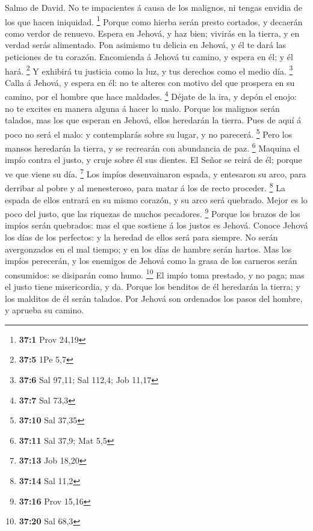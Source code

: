  Salmo de David. No te impacientes á causa de los malignos,
ni tengas envidia de los que hacen iniquidad. \footnote{\textbf{37:1}
  Prov 24,19}  Porque como hierba serán presto cortados, y
decaerán como verdor de renuevo.  Espera en Jehová, y haz
bien; vivirás en la tierra, y en verdad serás alimentado. 
Pon asimismo tu delicia en Jehová, y él te dará las peticiones de tu
corazón.  Encomienda á Jehová tu camino, y espera en él; y
él hará. \footnote{\textbf{37:5} 1Pe 5,7}  Y exhibirá tu
justicia como la luz, y tus derechos como el medio día. \footnote{\textbf{37:6}
  Sal 97,11; Sal 112,4; Job 11,17}  Calla á Jehová, y espera
en él: no te alteres con motivo del que prospera en su camino, por el
hombre que hace maldades. \footnote{\textbf{37:7} Sal 73,3} 
Déjate de la ira, y depón el enojo: no te excites en manera alguna á
hacer lo malo.  Porque los malignos serán talados, mas los
que esperan en Jehová, ellos heredarán la tierra.  Pues de
aquí á poco no será el malo: y contemplarás sobre su lugar, y no
parecerá. \footnote{\textbf{37:10} Sal 37,35}  Pero los
mansos heredarán la tierra, y se recrearán con abundancia de paz.
\footnote{\textbf{37:11} Sal 37,9; Mat 5,5}  Maquina el
impío contra el justo, y cruje sobre él sus dientes.  El
Señor se reirá de él; porque ve que viene su día. \footnote{\textbf{37:13}
  Job 18,20}  Los impíos desenvainaron espada, y entesaron
su arco, para derribar al pobre y al menesteroso, para matar á los de
recto proceder. \footnote{\textbf{37:14} Sal 11,2}  La
espada de ellos entrará en su mismo corazón, y su arco será quebrado.
 Mejor es lo poco del justo, que las riquezas de muchos
pecadores. \footnote{\textbf{37:16} Prov 15,16}  Porque los
brazos de los impíos serán quebrados: mas el que sostiene á los justos
es Jehová.  Conoce Jehová los días de los perfectos: y la
heredad de ellos será para siempre.  No serán avergonzados
en el mal tiempo; y en los días de hambre serán hartos. 
Mas los impíos perecerán, y los enemigos de Jehová como la grasa de los
carneros serán consumidos: se disiparán como humo. \footnote{\textbf{37:20}
  Sal 68,3}  El impío toma prestado, y no paga; mas el
justo tiene misericordia, y da.  Porque los benditos de él
heredarán la tierra; y los malditos de él serán talados. 
Por Jehová son ordenados los pasos del hombre, y aprueba su camino.
